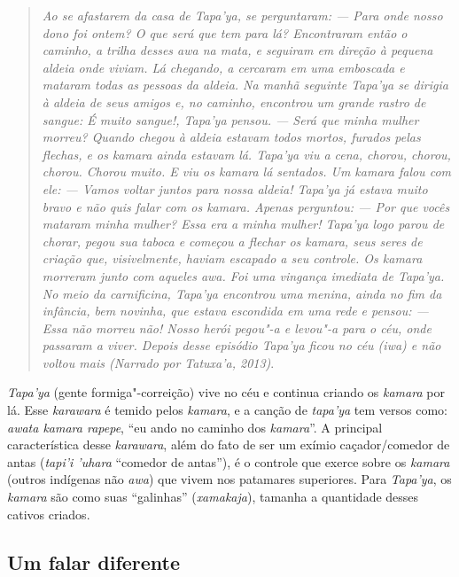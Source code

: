 \begin{quote}
\noindent
\emph{Ao se afastarem da casa de \emph{Tapa'ya}, se perguntaram: --- Para onde
nosso dono foi ontem? O que será que tem para lá? Encontraram então o
caminho, a trilha desses \emph{awa} na mata, e seguiram em direção à
pequena aldeia onde viviam. Lá chegando, a cercaram em uma emboscada e
mataram todas as pessoas da aldeia. Na manhã seguinte \emph{Tapa'ya} se
dirigia à aldeia de seus amigos e, no caminho, encontrou um grande
rastro de sangue: É muito sangue!, \emph{Tapa'ya} pensou. --- Será que
minha mulher morreu? Quando chegou à aldeia estavam todos mortos,
furados pelas flechas, e os \emph{kamara} ainda estavam lá.
\emph{Tapa'ya} viu a cena, chorou, chorou, chorou. Chorou muito. E viu
os \emph{kamara} lá sentados. Um \emph{kamara} falou com ele: --- Vamos
voltar juntos para nossa aldeia! \emph{Tapa'ya} já estava muito bravo e
não quis falar com os \emph{kamara}. Apenas perguntou: --- Por que vocês
mataram minha mulher? Essa era a minha mulher! \emph{Tapa'ya} logo parou
de chorar, pegou sua taboca e começou a flechar os \emph{kamara}, seus
seres de criação que, visivelmente, haviam escapado a seu controle. Os
\emph{kamara} morreram junto com aqueles \emph{awa}. Foi uma vingança
imediata de \emph{Tapa'ya}. No meio da carnificina, \emph{Tapa'ya}
encontrou uma menina, ainda no fim da infância, bem novinha, que estava
escondida em uma rede e pensou: --- Essa não morreu não! Nosso herói
pegou"-a e levou"-a para o céu, onde passaram a viver. Depois desse
episódio \emph{Tapa'ya} ficou no céu (\emph{iwa}) e não voltou mais (Narrado por Tatuxa'a, 2013)}.
\end{quote}

\emph{Tapa'ya} (gente formiga"-correição) vive no céu e continua criando
os \emph{kamara} por lá. Esse \emph{karawara} é temido pelos
\emph{kamara}, e a canção de \emph{tapa'ya} tem versos como: \emph{awata
kamara rapepe}, ``eu ando no caminho dos \emph{kamara}''. A principal
característica desse \emph{karawara}, além do fato de ser um exímio
caçador/comedor de antas (\emph{tapi'i 'uhara} ``comedor de antas''), é
o controle que exerce sobre os \emph{kamara} (outros indígenas não
\emph{awa}) que vivem nos patamares superiores. Para \emph{Tapa'ya}, os
\emph{kamara} são como suas ``galinhas'' (\emph{xamakaja}), tamanha a
quantidade desses cativos criados.

\subsection{Um falar diferente}

